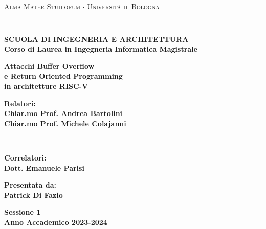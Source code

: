\documentclass[11pt]{report}
\newcommand\myemptypage{
    \null
    \thispagestyle{empty}
    \newpage
}
\begin{document}
\begin{titlepage}
\begin{center}
{{\Large{\textsc{Alma Mater Studiorum $\cdot$ Universit\`a di
Bologna}}}} \rule[0.1cm]{15.8cm}{0.1mm}
\rule[0.5cm]{15.8cm}{0.6mm}
{\small{\bf SCUOLA DI INGEGNERIA E ARCHITETTURA\\
Corso di Laurea in Ingegneria Informatica Magistrale}}
\end{center}
\vspace{30mm}
\begin{center}
{\LARGE{\bf Attacchi Buffer Overflow}}\\
\vspace{3mm}
{\LARGE{\bf e Return Oriented Programming}}\\
\vspace{3mm}
{\LARGE{\bf in architetture RISC-V}}\\
\end{center}
\vspace{40mm}
\par
\noindent
\begin{minipage}[t]{0.47\textwidth}
{\large{\bf Relatori:\\
Chiar.mo Prof. Andrea Bartolini\\
Chiar.mo Prof. Michele Colajanni\\}}
\vspace{1cm}
\end{minipage}
\\
\begin{minipage}[t]{0.47\textwidth}
{\large{\bf Correlatori:\\
Dott. Emanuele Parisi\\}}

\end{minipage}
\hfill
\begin{minipage}[t]{0.47\textwidth}\raggedleft
{\large{\bf Presentata da:\\
Patrick Di Fazio}}
\end{minipage}
\vspace{20mm}
\begin{center}
{\large{\bf Sessione 1\\
Anno Accademico 2023-2024}}
\end{center}
\end{titlepage}



\myemptypage

\tableofcontents
\newpage


\newpage
\myemptypage

\newpage

\newpage

\newpage

\newpage

\newpage

\newpage
\end{document}
